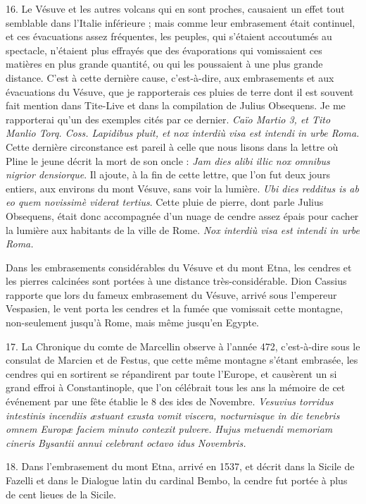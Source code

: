 \documentclass[a4paper, 11pt, oneside, polutonikogreek, french]{article}
\begin{document}
16. Le Vésuve et les autres volcans qui en sont proches, causaient un effet tout semblable dans l'Italie inférieure ; mais comme leur embrasement était continuel, et ces évacuations assez fréquentes, les peuples, qui s'étaient accoutumés au spectacle, n'étaient plus effrayés que des évaporations qui vomissaient ces matières en plus grande quantité, ou qui les poussaient à une plus grande distance. C'est à cette dernière cause, c'est-à-dire, aux embrasements et aux évacuations du Vésuve, que je rapporterais ces pluies de terre dont il est souvent fait mention dans Tite-Live et dans la compilation de Julius Obsequens. Je me rapporterai qu'un des exemples cités par ce dernier. \emph{Caïo Martio 3, et Tito Manlio Torq. Coss. Lapidibus pluit, et nox interdiù visa est intendi in urbe Roma.} Cette dernière circonstance est pareil à celle que nous lisons dans la lettre où Pline le jeune décrit la mort de son oncle : \emph{Jam dies alibi illic nox omnibus nigrior densiorque}. Il ajoute, à la fin de cette lettre, que l'on fut deux jours entiers, aux environs du mont Vésuve, sans voir la lumière. \emph{Ubi dies redditus is ab eo quem novissimè viderat tertius}. Cette pluie de pierre, dont parle Julius Obsequens, était donc accompagnée d'un nuage de cendre assez épais pour cacher la lumière aux habitants de la ville de Rome. \emph{Nox interdiù visa est intendi in urbe Roma.}

Dans les embrasements considérables du Vésuve et du mont Etna, les cendres et les pierres calcinées sont portées à une distance très-considérable. Dion Cassius rapporte que lors du fameux embrasement du Vésuve, arrivé sous l'empereur Vespasien, le vent porta les cendres et la fumée que vomissait cette montagne, non-seulement jusqu'à Rome, mais même jusqu'en Egypte.

17. La Chronique du comte de Marcellin observe à l'année 472, c'est-à-dire sous le consulat de Marcien et de Festus, que cette même montagne s'étant embrasée, les cendres qui en sortirent se répandirent par toute l'Europe, et causèrent un si grand effroi à Constantinople, que l'on célébrait tous les ans la mémoire de cet événement par une fête établie le 8 des ides de Novembre. \emph{Vesuvius torridus intestinis incendiis æstuant exusta vomit viscera, nocturnisque in die tenebris omnem Europæ faciem minuto contexit pulvere. Hujus metuendi memoriam cineris Bysantii annui celebrant octavo idus Novembris.}

18. Dans l'embrasement du mont Etna, arrivé en 1537, et décrit dans la Sicile de Fazelli et dans le Dialogue latin du cardinal Bembo, la cendre fut portée à plus de cent lieues de la Sicile.
\end{document}
